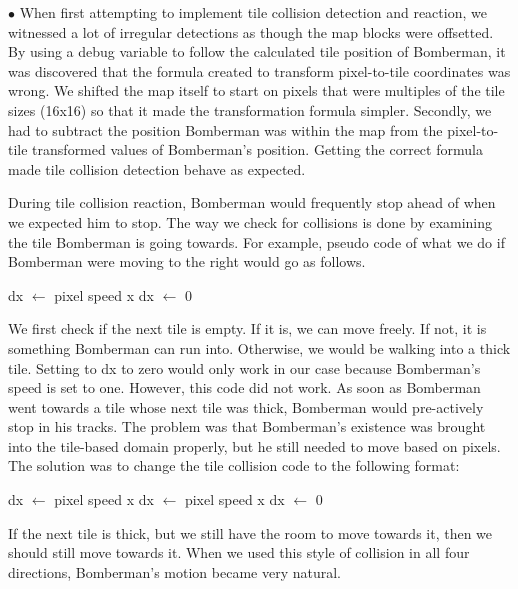 \documentclass[10pt,a4paper]{article}
\begin{document}
$ \bullet $ When first attempting to implement tile collision detection and reaction, we witnessed a lot of irregular detections as though the map blocks were offsetted. By using a debug variable to follow the calculated tile position of Bomberman, it was discovered that the formula created to transform pixel-to-tile coordinates was wrong. We shifted the map itself to start on pixels that were multiples of the tile sizes (16x16) so that it made the transformation formula simpler. Secondly, we had to subtract the position Bomberman was within the map from the pixel-to-tile transformed values of Bomberman's position. Getting the correct formula made tile collision detection behave as expected.

During tile collision reaction, Bomberman would frequently stop ahead of when we expected him to stop. The way we check for collisions is done by examining the tile Bomberman is going towards. For example, pseudo code of what we do if Bomberman were moving to the right would go as follows.

\begin{algorithmic}
        \State dx $ \gets $ pixel speed x
    \Else
        \State dx $ \gets $ 0
    \EndIf
\EndIf
\end{algorithmic}

We first check if the next tile is empty. If it is, we can move freely. If not, it is something Bomberman can run into. Otherwise, we would be walking into a thick tile. Setting to dx to zero would only work in our case because Bomberman's speed is set to one. However, this code did not work. As soon as Bomberman went towards a tile whose next tile was thick, Bomberman would pre-actively stop in his tracks. The problem was that Bomberman's existence was brought into the tile-based domain properly, but he still needed to move based on pixels. The solution was to change the tile collision code to the following format:

\begin{algorithmic}
        \State dx $ \gets $ pixel speed x
        \State dx $ \gets $ pixel speed x
    \Else
        \State dx $ \gets $ 0
    \EndIf
\EndIf
\end{algorithmic}

If the next tile is thick, but we still have the room to move towards it, then we should still move towards it. When we used this style of collision in all four directions, Bomberman's motion became very natural.
\end{document}
